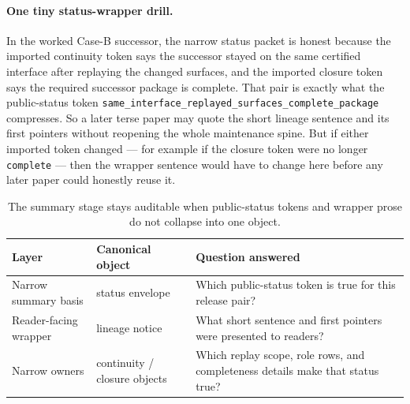 \documentclass[11pt]{article}
\begin{document}
\paragraph{One tiny status-wrapper drill.}
In the worked Case-B successor, the narrow status packet is honest because the imported continuity token says the successor stayed on the same certified interface after replaying the changed surfaces, and the imported closure token says the required successor package is complete. That pair is exactly what the public-status token \texttt{same\_interface\_replayed\_surfaces\_complete\_package} compresses. So a later terse paper may quote the short lineage sentence and its first pointers without reopening the whole maintenance spine. But if either imported token changed --- for example if the closure token were no longer \texttt{complete} --- then the wrapper sentence would have to change here before any later paper could honestly reuse it.\cite{series:workedexample}

\begin{table}[t]
\centering
\small
\begin{tabularx}{\linewidth}{@{}l l X@{}}
\toprule
Layer & Canonical object & Question answered \\
\midrule
Narrow summary basis & status envelope & Which public-status token is true for this release pair? \\
Reader-facing wrapper & lineage notice & What short sentence and first pointers were presented to readers? \\
Narrow owners & continuity / closure objects & Which replay scope, role rows, and completeness details make that status true? \\
\bottomrule
\end{tabularx}
\caption{The summary stage stays auditable when public-status tokens and wrapper prose do not collapse into one object.}
\label{tab:statussplit}
\end{table}
\end{document}
